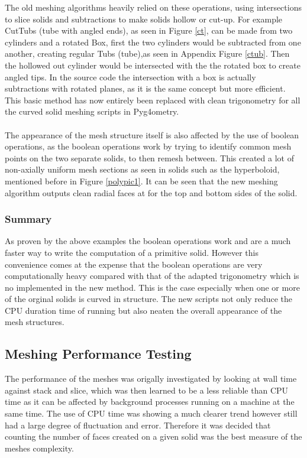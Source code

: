 \documentclass[12pt,a4paper]{article}
\begin{document}
\noindent The old meshing algorithms heavily relied on these operations, using intersections to slice solids and subtractions to make solids hollow or cut-up. For example CutTubs (tube with angled ends), as seen in Figure \ref{ct}, can be made from two cylinders and a rotated Box, first the two cylinders would be subtracted from one another, creating regular Tubs (tube),as seen in Appendix Figure \ref{ctub}. Then the hollowed out cylinder would be intersected with the the rotated box to create angled tips. In the source code the intersection with a box is actually subtractions with rotated planes, as it is the same concept but more efficient. This basic method has now entirely been replaced with clean trigonometry for all the curved solid meshing scripts in Pyg4ometry.
\\\\
The appearance of the mesh structure itself is also affected by the use of boolean operations, as the boolean operations work by trying to identify common mesh points on the two separate solids, to then remesh between. This created a lot of non-axially uniform mesh sections as seen in solids such as the hyperboloid, mentioned before in Figure \ref{polypic1}. It can be seen that the new meshing algorithm outputs clean radial faces at for the top and bottom sides of the solid.

\subsubsection{Summary}
As proven by the above examples the boolean operations work and are a much faster way to write the computation of a primitive solid. However this convenience comes at the expense that the boolean operations are very computationally heavy compared with that of the adapted trigonometry which is no implemented in the new method. This is the case especially when one or more of the orginal solids is curved in structure. The new scripts not only reduce the CPU duration time of running but also neaten the overall appearance of the mesh structures.


\subsection{Meshing Performance Testing}
The performance of the meshes was origally investigated by looking at wall time against stack and slice, which was then learned to be a less reliable than CPU time as it can be affected by background processes running on a machine at the same time. The use of CPU time was showing a much clearer trend however still had a large degree of fluctuation and error. Therefore it was decided that counting the number of faces created on a given solid was the best measure of the meshes complexity.
\end{document}

